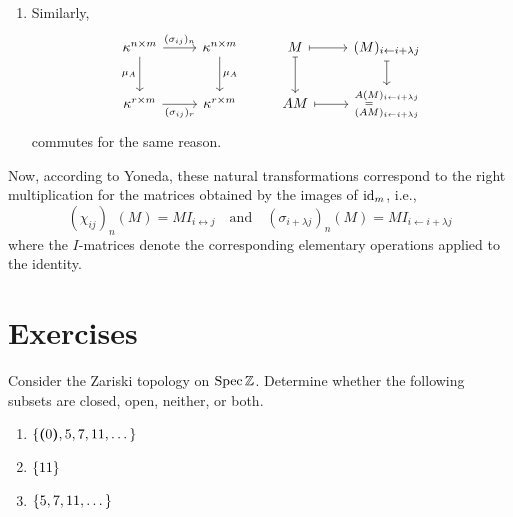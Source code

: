 \begin{xmpl}
\begin{enumerate}[\rm a)]
        \item Similarly,
        $$
            \begin{tikzcd}
                \kappa^{n\times m}
                        \arrow[r,"(\sigma_{ij})_n"]
                        \arrow[d,"\mu_A"']
                    &\kappa^{n\times m}
                        \arrow[d,"\mu_A"]
                    &M
                        \arrow[r,mapsto]
                        \arrow[d,mapsto]&(M)_{i\leftarrow i+\lambda j}
                        \arrow[d,mapsto]\\
                \kappa^{r\times m}
                        \arrow[r,"(\sigma_{ij})_r"']
                    &\kappa^{r\times m}
                    &AM
                        \arrow[r,mapsto]
                    &\substack{
                        A(M)_{i\leftarrow i+\lambda j}\\
                        =\hphantom{{}_{i\leftarrow i+\lambda j}}\\
                        (AM)_{i\leftarrow i+\lambda j}
                    }
            \end{tikzcd}
        $$
        commutes for the same reason.
    \end{enumerate}
    Now, according to Yoneda, these natural transformations correspond to the right multiplication for the matrices obtained by the images of $\text{\rm id}_m$, i.e.,
    $$
        (\chi_{ij})_n(M) = MI_{i\leftrightarrow j}
        \quad\text{and}\quad
        (\sigma_{i+\lambda j})_n(M) = MI_{i\leftarrow i+\lambda j}
    $$
    where the $I$-matrices denote the corresponding elementary operations applied to the identity.
\end{xmpl}

\section{Exercises}

\begin{exr}
    Consider the Zariski topology on\/ $\operatorname{Spec}\mathbb{Z}$. Determine whether the following subsets are closed, open, neither, or both.
    \begin{enumerate}[\rm a)]
        \item $\{\textrm{\boldmath$($}0\textrm{\boldmath$)$},5,7,11,\dots\}$
        \item $\{11\}$
        \item $\{5,7,11,\dots\}$
    \end{enumerate}
\end{exr}

